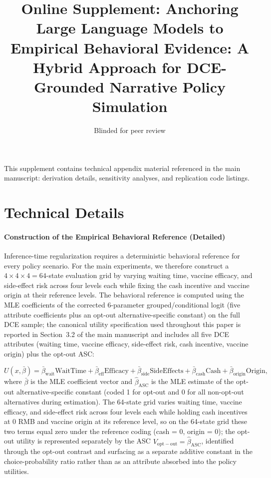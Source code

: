 \documentclass[11pt]{article}
\title{Online Supplement: Anchoring Large Language Models to Empirical Behavioral Evidence: A Hybrid Approach for DCE-Grounded Narrative Policy Simulation}
\author{Blinded for peer review}
\date{}
\begin{document}
\maketitle

This supplement contains technical appendix material referenced in the main manuscript: derivation details, sensitivity analyses, and replication code listings.

\appendix
\section{Technical Details}
\paragraph{Construction of the Empirical Behavioral Reference (Detailed)}

\medskip

Inference-time regularization requires a deterministic behavioral reference for every policy scenario. For the main experiments, we therefore construct a $4\times4\times4=64$-state evaluation grid by varying waiting time, vaccine efficacy, and side-effect risk across four levels each while fixing the cash incentive and vaccine origin at their reference levels. The behavioral reference is computed using the MLE coefficients of the corrected 6-parameter grouped/conditional logit (five attribute coefficients plus an opt-out alternative-specific constant) on the full DCE sample; the canonical utility specification used throughout this paper is reported in Section~3.2 of the main manuscript and includes all five DCE attributes (waiting time, vaccine efficacy, side-effect risk, cash incentive, vaccine origin) plus the opt-out ASC:

\[
U(x, \bar\beta) = \bar\beta_{\mathrm{wait}}\mathrm{WaitTime} + \bar\beta_{\mathrm{eff}}\mathrm{Efficacy} + \bar\beta_{\mathrm{side}}\mathrm{SideEffects} + \bar\beta_{\mathrm{cash}}\mathrm{Cash} + \bar\beta_{\mathrm{origin}}\mathrm{Origin},
\]
where $\bar\beta$ is the MLE coefficient vector and $\hat\beta_{\mathrm{ASC}}$ is the MLE estimate of the opt-out alternative-specific constant (coded 1 for opt-out and 0 for all non-opt-out alternatives during estimation). The 64-state grid varies waiting time, vaccine efficacy, and side-effect risk across four levels each while holding cash incentives at 0 RMB and vaccine origin at its reference level, so on the 64-state grid these two terms equal zero under the reference coding (cash = 0, origin = 0); the opt-out utility is represented separately by the ASC $V_{\mathrm{opt-out}} = \hat\beta_{\mathrm{ASC}}$, identified through the opt-out contrast and surfacing as a separate additive constant in the choice-probability ratio rather than as an attribute absorbed into the policy utilities.
\end{document}
